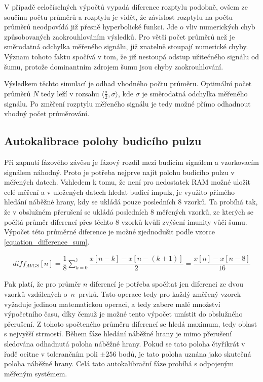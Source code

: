 V případě celočíselných výpočtů vypadá diference rozptylu podobně, ovšem ze součinu počtu průměrů a rozptylu je vidět, že závislost rozptylu na počtu průměrů neodpovídá již přesně hyperbolické funkci. Jde o vliv numerických chyb způsobovaných zaokrouhlováním výsledků. Pro větší počet průměrů než je směrodatná odchylka měřeného signálu, již znatelně stoupají numerické chyby. Význam tohoto faktu spočívá v tom, že již nestoupá odstup užitečného signálu od šumu, protože dominantním zdrojem šumu jsou chyby zaokrouhlování.

Výsledkem těchto simulací je odhad vhodného počtu průměru. Optimální počet průměrů $N$ tedy leží v rozsahu $\langle\frac{\sigma}{2}, \sigma \rangle$, kde $\sigma$ je směrodatná odchylka měřeného signálu. Po změření rozptylu měřeného signálu je tedy možné přímo odhadnout vhodný počet průměrování.

\subsection{Autokalibrace polohy budicího pulzu}
Při zapnutí fázového závěsu je fázový rozdíl mezi budicím signálem a vzorkovacím signálem náhodný. Proto je potřeba nejprve najít polohu budicího pulzu v měřených datech. Vzhledem k tomu, že není pro nedostatek RAM možné uložit celé měření a v uložených datech hledat budicí impulz, je využito přímého hledání náběžné hrany, kdy se ukládá pouze posledních 8 vzorků. Ta probíhá tak, že v obslužném přerušení se ukládá posledních 8 měřených vzorků, ze kterých se počítá průměr diferencí přes těchto 8 vzorků kvůli zvýšení imunity vůči šumu. Výpočet této průměrné diference je možné zjednodušit podle vzorce \ref{equation_difference_sum}. 

\begin{equation}
\begin{gathered}
	diff_{AVG8}[n]= \dfrac{1}{8} \sum_{k=0}^7 \dfrac{x[n-k]-x[n-(k+1)]}{2}= \dfrac{x[n]-x[n-8]}{16}
\end{gathered}
\label{equation_difference_sum}
\end{equation}

Pak platí, že pro průměr $n$ diferencí je potřeba spočítat jen diferenci ze dvou vzorků vzdálených o~$n$~prvků. Tato operace tedy pro každý změřený vzorek vyžaduje jedinou matematickou operaci, a tedy zabere malé množství výpočetního času, díky čemuž je možné tento výpočet umístit do obslužného přerušení. Z tohoto spočteného průměru diferencí se hledá maximum, tedy oblast s nejvyšší strmostí. Během fáze hledání náběžné hrany je mimo přerušení sledována odhadnutá poloha náběžné hrany. Pokud se tato poloha čtyřikrát v řadě ocitne v tolerančním poli $\pm256$ bodů, je tato poloha uznána jako skutečná poloha náběžné hrany. Celá tato autokalibrační fáze probíhá s odpojeným měřeným systémem.

